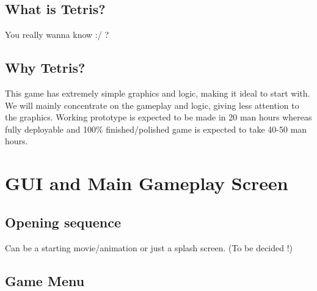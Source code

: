 \documentclass[10pt]{report}
\theoremstyle{definition}
\theoremstyle{remark}
\begin{document}
\section{What is Tetris?}
You really wanna know :/ ?

\section{Why Tetris?}
This game has extremely simple graphics and logic, making it ideal to start with. We will mainly concentrate on the gameplay and logic, giving less attention to the graphics. Working prototype is expected to be made in 20 man hours whereas fully deployable and 100\% finished/polished game is expected to take 40-50 man hours.


\chapter{GUI and Main Gameplay Screen}

\section{Opening sequence}
Can be a starting movie/animation or just a splash screen. (To be decided !)

\section{Game Menu}
\end{document}

